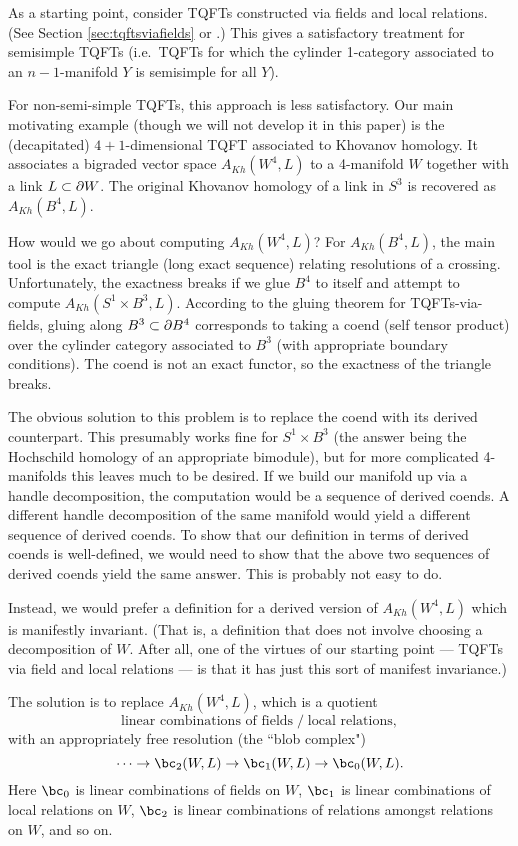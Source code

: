 As a starting point, consider TQFTs constructed via fields and local relations.
(See Section \ref{sec:tqftsviafields} or \cite{kw:tqft}.)
This gives a satisfactory treatment for semisimple TQFTs
(i.e.\ TQFTs for which the cylinder 1-category associated to an
$n{-}1$-manifold $Y$ is semisimple for all $Y$).

For non-semi-simple TQFTs, this approach is less satisfactory.
Our main motivating example (though we will not develop it in this paper)
is the (decapitated) $4{+}1$-dimensional TQFT associated to Khovanov homology.
It associates a bigraded vector space $A_{Kh}(W^4, L)$ to a 4-manifold $W$ together
with a link $L \subset \partial W$.
The original Khovanov homology of a link in $S^3$ is recovered as $A_{Kh}(B^4, L)$.

How would we go about computing $A_{Kh}(W^4, L)$?
For $A_{Kh}(B^4, L)$, the main tool is the exact triangle (long exact sequence)
relating resolutions of a crossing.
Unfortunately, the exactness breaks if we glue $B^4$ to itself and attempt
to compute $A_{Kh}(S^1\times B^3, L)$.
According to the gluing theorem for TQFTs-via-fields, gluing along $B^3 \subset \partial B^4$
corresponds to taking a coend (self tensor product) over the cylinder category
associated to $B^3$ (with appropriate boundary conditions).
The coend is not an exact functor, so the exactness of the triangle breaks.


The obvious solution to this problem is to replace the coend with its derived counterpart.
This presumably works fine for $S^1\times B^3$ (the answer being the Hochschild homology
of an appropriate bimodule), but for more complicated 4-manifolds this leaves much to be desired.
If we build our manifold up via a handle decomposition, the computation
would be a sequence of derived coends.
A different handle decomposition of the same manifold would yield a different
sequence of derived coends.
To show that our definition in terms of derived coends is well-defined, we
would need to show that the above two sequences of derived coends yield the same answer.
This is probably not easy to do.

Instead, we would prefer a definition for a derived version of $A_{Kh}(W^4, L)$
which is manifestly invariant.
(That is, a definition that does not
involve choosing a decomposition of $W$.
After all, one of the virtues of our starting point --- TQFTs via field and local relations ---
is that it has just this sort of manifest invariance.)

The solution is to replace $A_{Kh}(W^4, L)$, which is a quotient
\[
 \text{linear combinations of fields} \;\big/\; \text{local relations} ,
\]
with an appropriately free resolution (the ``blob complex")
\[
	\cdots\to \bc_2(W, L) \to \bc_1(W, L) \to \bc_0(W, L) .
\]
Here $\bc_0$ is linear combinations of fields on $W$,
$\bc_1$ is linear combinations of local relations on $W$,
$\bc_2$ is linear combinations of relations amongst relations on $W$,
and so on.

